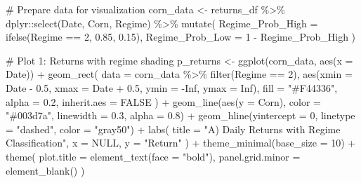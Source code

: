 \documentclass[
  10pt,
  a4paper,
]{article}
\newenvironment{Shaded}{\begin{snugshade}}{\end{snugshade}}
\newcommand{\AttributeTok}[1]{\textcolor[rgb]{0.40,0.45,0.13}{#1}}
\newcommand{\CommentTok}[1]{\textcolor[rgb]{0.37,0.37,0.37}{#1}}
\newcommand{\ConstantTok}[1]{\textcolor[rgb]{0.56,0.35,0.01}{#1}}
\newcommand{\DecValTok}[1]{\textcolor[rgb]{0.68,0.00,0.00}{#1}}
\newcommand{\FloatTok}[1]{\textcolor[rgb]{0.68,0.00,0.00}{#1}}
\newcommand{\FunctionTok}[1]{\textcolor[rgb]{0.28,0.35,0.67}{#1}}
\newcommand{\NormalTok}[1]{\textcolor[rgb]{0.00,0.23,0.31}{#1}}
\newcommand{\OtherTok}[1]{\textcolor[rgb]{0.00,0.23,0.31}{#1}}
\newcommand{\SpecialCharTok}[1]{\textcolor[rgb]{0.37,0.37,0.37}{#1}}
\newcommand{\StringTok}[1]{\textcolor[rgb]{0.13,0.47,0.30}{#1}}
\begin{document}
\begin{Shaded}
\begin{Highlighting}[]
\CommentTok{\# Prepare data for visualization}
\NormalTok{corn\_data }\OtherTok{\textless{}{-}}\NormalTok{ returns\_df }\SpecialCharTok{\%\textgreater{}\%}
\NormalTok{  dplyr}\SpecialCharTok{::}\FunctionTok{select}\NormalTok{(Date, Corn, Regime) }\SpecialCharTok{\%\textgreater{}\%}
  \FunctionTok{mutate}\NormalTok{(}
    \AttributeTok{Regime\_Prob\_High =} \FunctionTok{ifelse}\NormalTok{(Regime }\SpecialCharTok{==} \DecValTok{2}\NormalTok{, }\FloatTok{0.85}\NormalTok{, }\FloatTok{0.15}\NormalTok{),}
    \AttributeTok{Regime\_Prob\_Low =} \DecValTok{1} \SpecialCharTok{{-}}\NormalTok{ Regime\_Prob\_High}
\NormalTok{  )}

\CommentTok{\# Plot 1: Returns with regime shading}
\NormalTok{p\_returns }\OtherTok{\textless{}{-}} \FunctionTok{ggplot}\NormalTok{(corn\_data, }\FunctionTok{aes}\NormalTok{(}\AttributeTok{x =}\NormalTok{ Date)) }\SpecialCharTok{+}
  \FunctionTok{geom\_rect}\NormalTok{(}
    \AttributeTok{data =}\NormalTok{ corn\_data }\SpecialCharTok{\%\textgreater{}\%} \FunctionTok{filter}\NormalTok{(Regime }\SpecialCharTok{==} \DecValTok{2}\NormalTok{),}
    \FunctionTok{aes}\NormalTok{(}\AttributeTok{xmin =}\NormalTok{ Date }\SpecialCharTok{{-}} \FloatTok{0.5}\NormalTok{, }\AttributeTok{xmax =}\NormalTok{ Date }\SpecialCharTok{+} \FloatTok{0.5}\NormalTok{, }\AttributeTok{ymin =} \SpecialCharTok{{-}}\ConstantTok{Inf}\NormalTok{, }\AttributeTok{ymax =} \ConstantTok{Inf}\NormalTok{),}
    \AttributeTok{fill =} \StringTok{"\#F44336"}\NormalTok{, }\AttributeTok{alpha =} \FloatTok{0.2}\NormalTok{, }\AttributeTok{inherit.aes =} \ConstantTok{FALSE}
\NormalTok{  ) }\SpecialCharTok{+}
  \FunctionTok{geom\_line}\NormalTok{(}\FunctionTok{aes}\NormalTok{(}\AttributeTok{y =}\NormalTok{ Corn), }\AttributeTok{color =} \StringTok{"\#003d7a"}\NormalTok{, }\AttributeTok{linewidth =} \FloatTok{0.3}\NormalTok{, }\AttributeTok{alpha =} \FloatTok{0.8}\NormalTok{) }\SpecialCharTok{+}
  \FunctionTok{geom\_hline}\NormalTok{(}\AttributeTok{yintercept =} \DecValTok{0}\NormalTok{, }\AttributeTok{linetype =} \StringTok{"dashed"}\NormalTok{, }\AttributeTok{color =} \StringTok{"gray50"}\NormalTok{) }\SpecialCharTok{+}
  \FunctionTok{labs}\NormalTok{(}
    \AttributeTok{title =} \StringTok{"A) Daily Returns with Regime Classification"}\NormalTok{,}
    \AttributeTok{x =} \ConstantTok{NULL}\NormalTok{,}
    \AttributeTok{y =} \StringTok{"Return"}
\NormalTok{  ) }\SpecialCharTok{+}
  \FunctionTok{theme\_minimal}\NormalTok{(}\AttributeTok{base\_size =} \DecValTok{10}\NormalTok{) }\SpecialCharTok{+}
  \FunctionTok{theme}\NormalTok{(}
    \AttributeTok{plot.title =} \FunctionTok{element\_text}\NormalTok{(}\AttributeTok{face =} \StringTok{"bold"}\NormalTok{),}
    \AttributeTok{panel.grid.minor =} \FunctionTok{element\_blank}\NormalTok{()}
\NormalTok{  )}


\end{Highlighting}
\end{Shaded}
\end{document}
